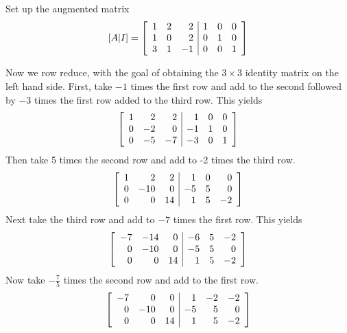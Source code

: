 \begin{solution} Set up the augmented matrix
\begin{equation*}
\left[ A|I\right] =  
\left[
\begin{array}{rrr|rrr}
1 & 2 & 2 & 1 & 0 & 0 \\
1 & 0 & 2 & 0 & 1 & 0 \\
3 & 1 & -1 & 0 & 0 & 1
\end{array}
\right]
\end{equation*}

Now we row reduce, with the goal of obtaining the $3 \times 3$ identity matrix on the left hand side.
First, take $-1 $ times the first row and add to the second
followed by $-3 $ times the first row added to the third row. This
yields
\begin{equation*}
\allowbreak \left[
\begin{array}{rrr|rrr}
1 & 2 & 2 & 1 & 0 & 0 \\
0 & -2 & 0 & -1 & 1 & 0 \\
0 & -5 & -7 & -3 & 0 & 1
\end{array}
\right] 
\end{equation*}
Then take 5 times the second row and add to -2 times the third row.
\begin{equation*}
\left[
\begin{array}{rrr|rrr}
1 & 2 & 2 & 1 & 0 & 0 \\
0 & -10 & 0 & -5 & 5 & 0 \\
0 & 0 & 14 & 1 & 5 & -2
\end{array}
\right]
\end{equation*}
Next take the third row and add to $ -7$ times the first row.
This yields
\begin{equation*}
\left[ 
\begin{array}{rrr|rrr}
-7 & -14 & 0 & -6 & 5 & -2 \\
0 & -10 & 0 & -5 & 5 & 0 \\
0 & 0 & 14 & 1 & 5 & -2
\end{array}
\right] 
\end{equation*}
Now take $ -\frac{7}{5}$ times the second row and add to the first row.
\begin{equation*}
 \left[
\begin{array}{rrr|rrr}
-7 & 0 & 0 & 1 & -2 & -2 \\
0 & -10 & 0 & -5 & 5 & 0 \\
0 & 0 & 14 & 1 & 5 & -2
\end{array}
\right] 
\end{equation*}

\end{solution}
